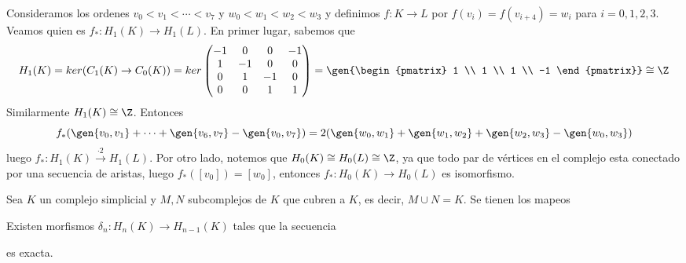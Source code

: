 \documentclass{article}
\begin{document}
Consideramos los ordenes $v_{0}<v_{1}<\cdots<v_{7}$ y $w_{0}<w_{1}<w_{2}<w_{3}$ y definimos 
$f:K\to L$ por $f(v_{i})=f(v_{i+4})=w_{i}$ para $i=0,1,2,3$. Veamos quien es 
$f_{*}:H_{1}(K)\to H_{1}(L)$. En primer lugar, sabemos que
\begin{equation*}
    H_{1}(K)=ker(C_{1}(K)\to C_{0}(K))=ker\begin{pmatrix}
        -1 & 0 & 0 & -1 \\ 1 & -1 & 0 & 0 \\ 0 & 1 & -1 & 0 \\ 0 & 0 & 1 & 1
    \end{pmatrix}=\gen{\begin{pmatrix}
        1 \\ 1 \\ 1 \\ -1
    \end{pmatrix}}\cong\Z
\end{equation*}
Similarmente $H_{1}(K)\cong\Z$. Entonces
\begin{equation*}
    f_{*}(\gen{v_{0},v_{1}}+\cdots+\gen{v_{6},v_{7}}-\gen{v_{0},v_{7}})
    =2(\gen{w_{0},w_{1}}+\gen{w_{1},w_{2}}+\gen{w_{2},w_{3}}-\gen{w_{0},w_{3}})
\end{equation*}
luego $f_{*}:H_{1}(K)\xrightarrow{\cdot2} H_{1}(L)$. Por otro lado, notemos que 
$H_{0}(K)\cong H_{0}(L)\cong\Z$, ya que todo par de vértices en el complejo esta conectado por una
secuencia de aristas, luego $f_{*}([v_{0}])=[w_{0}]$, entonces 
$f_{*}:H_{0}(K)\xrightarrow{} H_{0}(L)$ es isomorfismo.

\vspace{2mm}
\begin{teo}
    Sea $K$ un complejo simplicial y $M,N$ subcomplejos de $K$ que cubren a $K$, es decir, 
    $M\cup N=K$. Se tienen los mapeos
    
    \centerline{
    }

    \vspace{2mm}
    Existen morfismos $\delta_{n}:H_{n}(K)\to H_{n-1}(K)$ tales que la secuencia

    \centerline{
        \xymatrixcolsep{3pc}
    }
    es exacta.
\end{teo}
\end{document}
